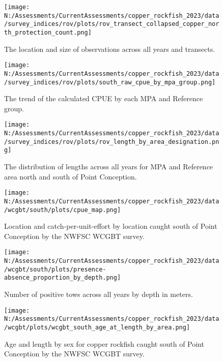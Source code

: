 \documentclass[11pt,
  english,
  letterpaper,
]{article}
\begin{document}
\begin{figure}
\centering
\texttt{[image: N:/Assessments/CurrentAssessments/copper\_rockfish\_2023/data/survey\_indices/rov/plots/rov\_transect\_collapsed\_copper\_north\_protection\_count.png]}
\caption{The location and size of observations across all years and transects.\label{fig:rov-obs-loc}}
\end{figure}

\begin{figure}
\centering
\texttt{[image: N:/Assessments/CurrentAssessments/copper\_rockfish\_2023/data/survey\_indices/rov/plots/south\_raw\_cpue\_by\_mpa\_group.png]}
\caption{The trend of the calculated CPUE by each MPA and Reference group.\label{fig:rov-raw-cpue}}
\end{figure}

\begin{figure}
\centering
\texttt{[image: N:/Assessments/CurrentAssessments/copper\_rockfish\_2023/data/survey\_indices/rov/plots/rov\_length\_by\_area\_designation.png]}
\caption{The distribution of lengths across all years for MPA and Reference area north and south of Point Conception.\label{fig:rov-len}}
\end{figure}

\begin{figure}
\centering
\texttt{[image: N:/Assessments/CurrentAssessments/copper\_rockfish\_2023/data/wcgbt/south/plots/cpue\_map.png]}
\caption{Location and catch-per-unit-effort by location caught south of Point Conception by the NWFSC WCGBT survey.\label{fig:wcgbt-cpue}}
\end{figure}

\begin{figure}
\centering
\texttt{[image: N:/Assessments/CurrentAssessments/copper\_rockfish\_2023/data/wcgbt/south/plots/presence-absence\_proportion\_by\_depth.png]}
\caption{Number of positive tows across all years by depth in meters.\label{fig:wcgbt-depth}}
\end{figure}

\begin{figure}
\centering
\texttt{[image: N:/Assessments/CurrentAssessments/copper\_rockfish\_2023/data/wcgbt/plots/wcgbt\_south\_age\_at\_length\_by\_area.png]}
\caption{Age and length by sex for copper rockfish caught south of Point Conception by the NWFSC WCGBT survey.\label{fig:wcgbt-len-age}}
\end{figure}
\end{document}
